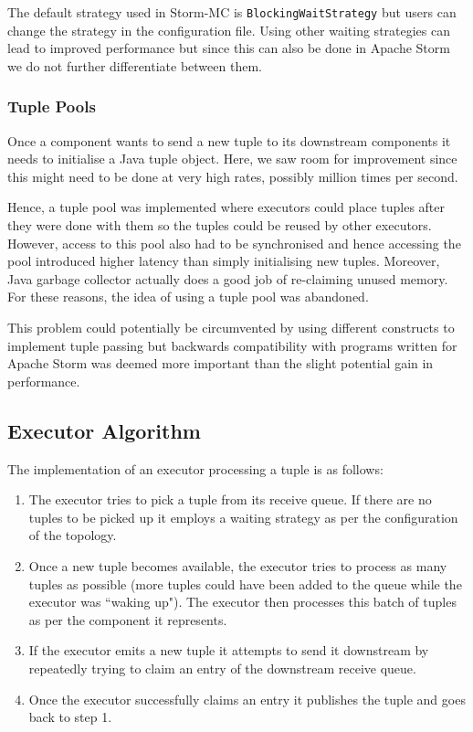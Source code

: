 \documentclass[bsc,twoside,singlespacing,normalheadings,parskip]{infthesis}\usepackage[]{graphicx}\usepackage[]{color}
\begin{document}
The default strategy used in Storm-MC is \texttt{BlockingWaitStrategy} but users can change the strategy in the configuration file. Using other waiting strategies can lead to improved performance but since this can also be done in Apache Storm we do not further differentiate between them.

\subsubsection{Tuple Pools}

Once a component wants to send a new tuple to its downstream components it needs to initialise a Java tuple object. Here, we saw room for improvement since this might need to be done at very high rates, possibly million times per second.

Hence, a tuple pool was implemented where executors could place tuples after they were done with them so the tuples could be reused by other executors. However, access to this pool also had to be synchronised and hence accessing the pool introduced higher latency than simply initialising new tuples. Moreover, Java garbage collector actually does a good job of re-claiming unused memory. For these reasons, the idea of using a tuple pool was abandoned.

This problem could potentially be circumvented by using different constructs to implement tuple passing but backwards compatibility with programs written for Apache Storm was deemed more important than the slight potential gain in performance.

\subsection{Executor Algorithm}

The implementation of an executor processing a tuple is as follows:

\begin{enumerate}
	\item The executor tries to pick a tuple from its receive queue. If there are no tuples to be picked up it employs a waiting strategy as per the configuration of the topology.
	\item Once a new tuple becomes available, the executor tries to process as many tuples as possible (more tuples could have been added to the queue while the executor was ``waking up"). The executor then processes this batch of tuples as per the component it represents.
	\item If the executor emits a new tuple it attempts to send it downstream by repeatedly trying to claim an entry of the downstream receive queue.
	\item Once the executor successfully claims an entry it publishes the tuple and goes back to step 1.
\end{enumerate}
\end{document}
